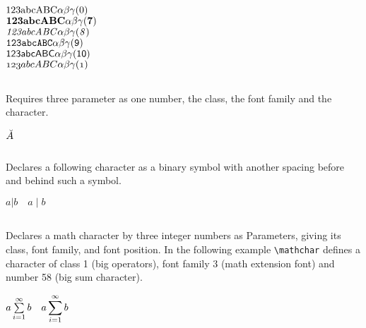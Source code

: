 \begin{table}[htb]
\begin{LTXexample}[width=0.3\linewidth]
$\mathrm{123abcABC\alpha\beta\gamma (\the\fam)}$\\[5pt]
$\mathbf{123abcABC\alpha\beta\gamma (\the\fam)}$\\[5pt]
$\mathit{123abcABC\alpha\beta\gamma (\the\fam)}$\\[5pt]
$\mathtt{123abcABC\alpha\beta\gamma (\the\fam)}$\\[5pt]
$\mathsf{123abcABC\alpha\beta\gamma (\the\fam)}$\\[5pt]
$\mathnormal{123abcABC\alpha\beta\gamma (\the\fam)}$
\end{LTXexample}
\fi

\subsection{}
Requires three parameter as one number, the class, the font family and the character.

\begin{LTXexample}[width=0.3\linewidth]
\def\dA{\mathaccent"7015\relax}
{\Large $\dA{A}$}
\end{LTXexample}

\subsection{}
Declares a following character as a binary symbol with another 
spacing before and behind such a symbol.

\begin{LTXexample}[width=0.3\linewidth]
{\Large 
$a|b \quad a\mathbin| b$}
\end{LTXexample}

\subsection{}
Declares a math character by three integer numbers as Parameters, giving its class,     %
font family, and font position. In the following example \verb+\mathchar+ defines a 
character of class 1 (big operators), font family 3 (math extension font) and number
58 (big sum character).

\begin{LTXexample}[width=0.3\linewidth]
{\Large 
$a\sum\limits_{i=1}^{\infty} b \quad 
 a\mathchar"1358\limits_{i=1}^{\infty} b$}
\end{LTXexample}


\end{table}

